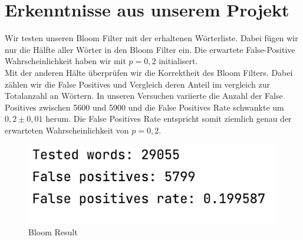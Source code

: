 \documentclass{article}
\begin{document}
    \clearpage


    \section{Erkenntnisse aus unserem Projekt}
    Wir testen unseren Bloom Filter mit der erhaltenen Wörterliste. Dabei fügen wir nur die Hälfte aller Wörter in den Bloom Filter ein. Die erwartete False-Positive Wahrscheinlichkeit haben wir mit $p = 0,2$ initialisert.
    \\
    Mit der anderen Hälte überprüfen wir die Korrektheit des Bloom Filters. Dabei zählen wir die False Positives und Vergleich deren Anteil im vergleich zur Totalanzahl an Wörtern. In unseren Versuchen variierte die Anzahl der False Positives zwischen 5600 und 5900 und die False Positives Rate schwankte um $0,2 \pm 0,01$ herum. Die False Positives Rate entspricht somit ziemlich genau der erwarteten Wahrscheinlichkeit von $p = 0,2$.
    \begin{figure}[h!]
        \centering
        \includegraphics{./lib/dist_bloomResult.png}
        \caption{Bloom Result}
        \label{fig:Bloom Result}
    \end{figure}
\end{document}
